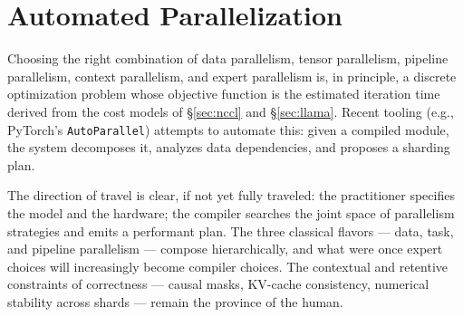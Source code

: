 \documentclass[11pt,a4paper]{article}
\theoremstyle{definition}
\theoremstyle{remark}
\theoremstyle{plain}
\begin{document}
\section{Automated Parallelization}
\label{sec:auto}

Choosing the right combination of data parallelism, tensor parallelism, pipeline parallelism, context parallelism, and expert parallelism is, in principle, a discrete optimization problem whose objective function is the estimated iteration time derived from the cost models of \S\ref{sec:nccl} and \S\ref{sec:llama}. Recent tooling (e.g., PyTorch's \texttt{AutoParallel}) attempts to automate this: given a compiled module, the system decomposes it, analyzes data dependencies, and proposes a sharding plan.

The direction of travel is clear, if not yet fully traveled: the practitioner specifies the model and the hardware; the compiler searches the joint space of parallelism strategies and emits a performant plan. The three classical flavors --- data, task, and pipeline parallelism --- compose hierarchically, and what were once expert choices will increasingly become compiler choices. The contextual and retentive constraints of correctness --- causal masks, KV-cache consistency, numerical stability across shards --- remain the province of the human.

\end{document}
